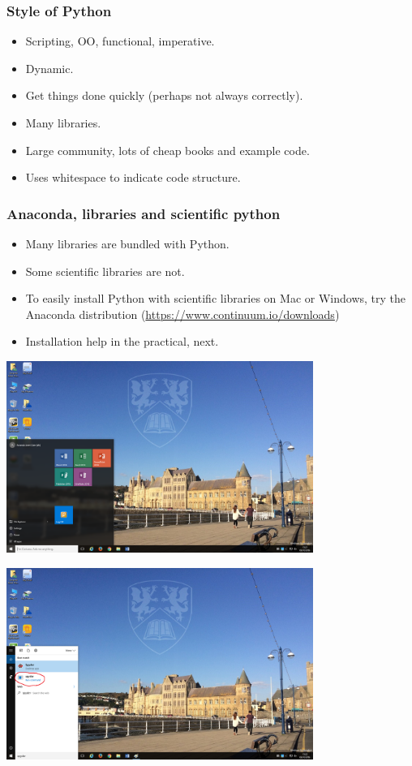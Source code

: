 \documentclass{beamer}
\begin{document}
\begin{frame}
\frametitle{Style of Python}
\begin{itemize}
\item Scripting, OO, functional, imperative.
\item Dynamic.
\item Get things done quickly (perhaps not always correctly).
\item Many libraries.
\item Large community, lots of cheap books and example code.
\item Uses whitespace to indicate code structure.
\end{itemize}
\end{frame}


\begin{frame}
\frametitle{Anaconda, libraries and scientific python}
\begin{itemize}
\item Many libraries are bundled with Python.
\item Some scientific libraries are not.
\item To easily install Python with scientific libraries on Mac or Windows, try the
  Anaconda distribution (\url{https://www.continuum.io/downloads})
\item Installation help in the practical, next.
\end{itemize}
\end{frame}


\begin{frame}
\begin{center}
\includegraphics[width=10cm]{windows10.png}
\end{center}
\end{frame}

\begin{frame}
\begin{center}
\includegraphics[width=10cm]{choosespyder.png}
\end{center}
\end{frame}
\end{document}
